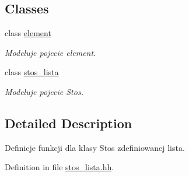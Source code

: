 \subsection*{Classes}
\begin{DoxyCompactItemize}
\item 
class \hyperlink{classelement}{element}
\begin{DoxyCompactList}\small\item\em Modeluje pojecie element. \end{DoxyCompactList}\item 
class \hyperlink{classstos__lista}{stos\-\_\-lista}
\begin{DoxyCompactList}\small\item\em Modeluje pojecie Stos. \end{DoxyCompactList}\end{DoxyCompactItemize}


\subsection{Detailed Description}
Definicje funkcji dla klasy Stos zdefiniowanej lista. 

Definition in file \hyperlink{stos__lista_8hh_source}{stos\-\_\-lista.\-hh}.

